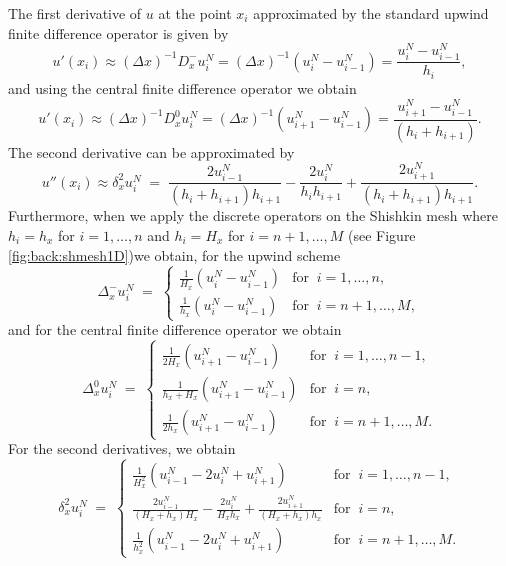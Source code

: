 The first derivative of $u$ at the point $x_i$ approximated by the standard
upwind finite difference operator is given by
\begin{equation*}
u'(x_i)\approx (\Delta x)^{-1}D^{-}_{x} u_{i}^N = (\Delta x)^{-1}(u_{i}^N-u_{i-1}^{N})=\frac{u_i^N-u_{i-1}^{N}}{h_i},
\end{equation*}
and using the central finite difference operator we obtain
\begin{equation*}\label{eq:firstcen}
u'(x_i)\approx (\Delta x)^{-1} D^{0}_{x} u_{i}^N =(\Delta x)^{-1}(u_{i+1}^N-u_{i-1}^{N})=\frac{u_{i+1}^N-u_{i-1}^{N}}{(h_i+h_{i+1})}.
\end{equation*}
The second derivative can be approximated by
\begin{equation*}
u''(x_i)\approx \delta^{2}_{x} u_{i}^N\; =\;
\frac{2 u_{i-1}^N}{(h_{i} + h_{i+1}) h_{i+1}}- \frac{2u_{i}^N}{h_{i} h_{i+1}} + \frac{2 u_{i+1}^N}{(h_{i} + h_{i+1}) h_{i+1}}.
\end{equation*}
Furthermore, when we apply the discrete operators on the Shishkin mesh where $h_i=h_x$ for $i=1,\ldots,n$ and $h_i=H_{x}$ for $i=n+1,\ldots,M$ (see Figure \ref{fig:back:shmesh1D})we
obtain, for the upwind scheme
\begin{equation}
\Delta^{-}_{x} u_{i}^N\; =\;
\begin{cases}
\frac{1}{H_x}\left(u_{i}^N-u_{i-1}^N\right) & \mbox{for}\;\; i=1,\ldots, n, \\
\frac{1}{h_x}\left(u_{i}^N-u_{i-1}^N\right) & \mbox{for}\;\; i={n+1},\ldots, M,
\end{cases}
\end{equation}
and for the central finite difference operator we obtain
\begin{equation}
\Delta^{0}_{x} u_{i}^N\; =\;
\begin{cases}
\frac{1}{2H_x}\left(u_{i+1}^N-u_{i-1}^N\right) &
\mbox{for}\;\; i=1,\ldots, {n-1},\\
\frac{1}{h_x+H_x}\left(u_{i+1}^N-u_{i-1}^N\right)  &
\mbox{for}\;\; i=n,\\
\frac{1}{2h_x}\left(u_{i+1}^N-u_{i-1}^N\right)  &
\mbox{for}\;\;i={n+1},\ldots, {M}.
\end{cases}
\end{equation}
For the second derivatives, we obtain
\begin{equation}\label{eq:back:second}
\delta^{2}_{x} u_{i}^N\; =\;
\begin{cases}
\frac{1}{H_x^2}\left(u_{i-1}^N - 2u_{i}^N + u_{i+1}^N\right) &
\mbox{for}\;\; i=1,\ldots, {n-1},\\
\frac{2u_{i-1}^N}{(H_x+h_x)H_x} - \frac{2u_{i}^N}{H_xh_x} + \frac{2u_{i+1}^N}{(H_x+h_x)h_x} &
\mbox{for}\;\; i=n,\\
\frac{1}{h_x^2}\left(u_{i-1}^N - 2u_{i}^N + u_{i+1}^N\right) &
\mbox{for}\;\;i={n+1},\ldots, {M}.
\end{cases}
\end{equation}

